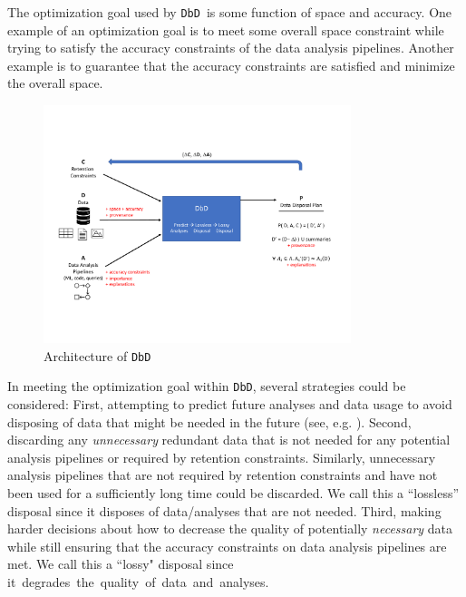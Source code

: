 \documentclass[11pt,dvipdfm]{article}
\newcommand{\grid}{{\tt DbD}}
\begin{document}
\newpage
The optimization goal used by \grid\ is some function of space and accuracy.  One example of an optimization goal is to meet some overall space constraint while trying to satisfy the accuracy constraints of the data analysis pipelines.  Another example is to guarantee that the accuracy constraints are satisfied and minimize the overall space.


\begin{figure}
\begin{center}
\includegraphics[width=0.8\textwidth, bb = 0 0 820 580]{figs/DbD-arch.pdf}
\vspace{-5mm}
\caption{Architecture of \grid}
\label{fig: arch}
\vspace{-5mm}
\end{center}
\end{figure}


In meeting the optimization goal within \grid, several strategies could be considered: First, attempting to predict future analyses and data usage to avoid disposing of data that might be needed in the future (see, e.g. \cite{MiloS20,sigmod20,ElMS20b}).  Second, discarding any {\em unnecessary} redundant data that is not needed for any potential analysis pipelines or required by retention constraints.  Similarly, unnecessary analysis pipelines that are not required by retention constraints and have not been used for a sufficiently long time could be discarded. We call this a ``lossless'' disposal since it disposes of data/analyses that are not needed.  Third, making harder decisions about how to decrease the quality of potentially {\em necessary} data while still ensuring that the accuracy constraints on data analysis pipelines are met.  We call this a ``lossy" disposal since \mbox{it degrades the quality of data and analyses.}
  
\end{document}
